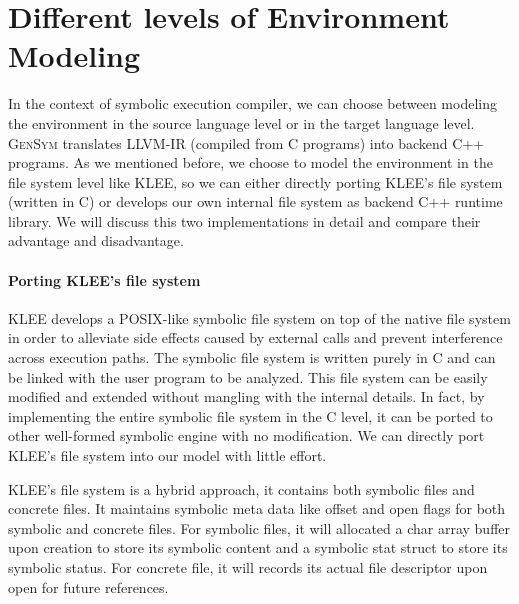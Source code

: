 \documentclass[sigplan, nonacm]{acmart}\settopmatter{printfolios=true,printccs=false,printacmref=false}
\newcommand{\tool}{\textsc{GenSym}\xspace}
\begin{document}
\section{Different levels of Environment Modeling}\label{twofsimpl}
In the context of symbolic execution compiler, we can choose between modeling the environment in the source language level or in the target language level. \tool translates LLVM-IR (compiled from C programs) into backend C++ programs. As we mentioned before, we choose to model the environment in the file system level like KLEE, so we can either directly porting KLEE's file system (written in C) or develops our own internal file system as backend C++ runtime library. We will discuss this two implementations in detail and compare their advantage and disadvantage.
\paragraph*{Porting KLEE's file system}
KLEE develops a POSIX-like symbolic file system on top of the native file system in order to alleviate side effects caused by external calls and prevent interference across execution paths. The symbolic file system is written purely in C and can be linked with the user program to be analyzed. This file system can be easily modified and extended without mangling
 with the internal details. In fact, by implementing the entire symbolic file system in the C level, it can be ported to other well-formed symbolic engine with no modification. We can directly port KLEE's file system into our model with little effort.\par
 KLEE's file system is a hybrid approach, it contains both symbolic files and concrete files. It maintains symbolic meta data like offset and open flags for both symbolic and concrete files. For symbolic files, it will allocated a char array buffer upon creation to store its symbolic content and a symbolic stat struct to store its symbolic status. For concrete file, it will records its actual file descriptor upon open for future references.\par
\end{document}
